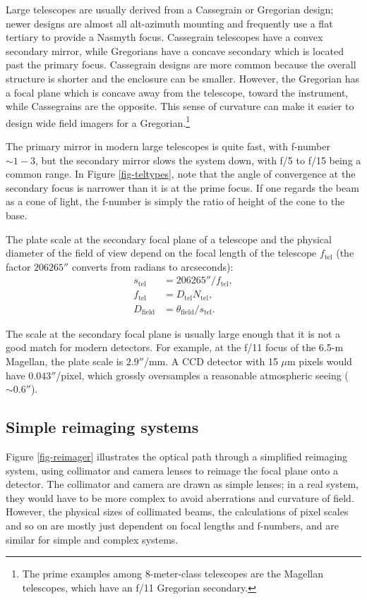\documentclass[12pt]{article}
\begin{document}
Large telescopes are usually derived from a Cassegrain or
Gregorian design; newer designs are almost all alt-azimuth 
mounting and frequently use a flat tertiary to provide a
Nasmyth focus.  Cassegrain telescopes have a convex secondary
mirror, while Gregorians have a concave secondary which is
located past the primary focus.  Cassegrain designs are more
common because the overall structure is shorter and the
enclosure can be smaller.  However, the Gregorian has a focal
plane which is concave away from the telescope, toward the
instrument, while Cassegrains are the opposite.  This sense
of curvature can make it easier to design wide field imagers
for a Gregorian.\footnote{The prime examples among 8-meter-class
telescopes are the Magellan telescopes, which have an f/11 Gregorian
secondary.}

The primary mirror in modern large telescopes is quite fast, with
f-number $\sim 1-3$, but the secondary mirror slows the system
down, with f/5 to f/15 being a common range.  In Figure
\ref{fig-teltypes}, note that the angle of convergence
at the secondary focus is narrower than it is at the prime
focus.  If one regards the beam as a cone of light, the f-number 
is simply the ratio of height of the cone to the base.

The plate scale at the secondary focal plane of a telescope and
the physical diameter of the field of view depend on the
focal length of the telescope $f_{\mathrm{tel}}$
(the factor $206265''$ converts from radians to arcseconds):
\begin{align*}
s_{\mathrm{tel}} &= 206265'' / f_{\mathrm{tel}}, \\
f_{\mathrm{tel}} &= D_{\mathrm{tel}} N_{\mathrm{tel}}, \\
D_{\mathrm{field}} &= \theta_{\mathrm{field}} / s_{\mathrm{tel}}.
\end{align*}

The scale at the secondary focal plane is usually large 
enough that it is not a good match for modern detectors.
For example, at the f/11 focus of the 6.5-m Magellan,
the plate scale is $2.9''$/mm.  A CCD detector with 15 $\mu$m pixels
would have $0.043''$/pixel, which grossly oversamples a
reasonable atmospheric seeing ($\sim 0.6''$).

\subsection{Simple reimaging systems}

Figure \ref{fig-reimager} illustrates the optical path
through a simplified reimaging system, using collimator 
and camera lenses to reimage the focal plane onto a detector.
The collimator and camera are drawn as simple lenses;
in a real system, they would have to be more complex
to avoid aberrations and curvature of field.  However,
the physical sizes of collimated beams,
the calculations of pixel scales and so on are mostly 
just dependent on focal lengths and f-numbers, and are
similar for simple and complex systems.
\end{document}

